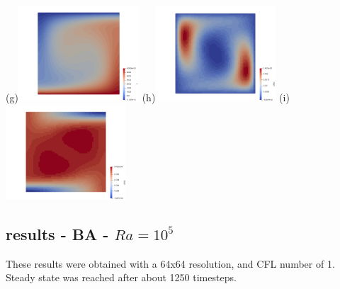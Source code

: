 \begin{center}
(g)\includegraphics[width=4.5cm]{python_codes/fieldstone_24/BA_104/T.png} 
(h)\includegraphics[width=4.5cm]{python_codes/fieldstone_24/BA_104/dTdx.png}
(i)\includegraphics[width=4.5cm]{python_codes/fieldstone_24/BA_104/dTdy.png}  \\
\end{center}

\newpage
\subsection*{results - BA - $Ra=10^5$}

These results were obtained with a 64x64 resolution, and CFL number of 1. Steady state was reached 
after about 1250 timesteps.

